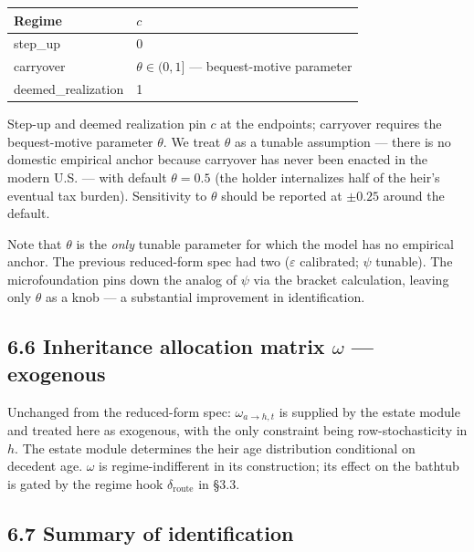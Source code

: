 \documentclass[11pt]{article}
\begin{document}
\begin{center}
\begin{tabular}{|l|l|}
\hline
Regime & $c$ \\
\hline
step\_up & 0 \\
\hline
carryover & $\theta \in (0, 1]$ — bequest-motive parameter \\
\hline
deemed\_realization & 1 \\
\hline
\end{tabular}
\end{center}

Step-up and deemed realization pin $c$ at the endpoints; carryover requires the bequest-motive parameter $\theta$. We treat $\theta$ as a tunable assumption — there is no domestic empirical anchor because carryover has never been enacted in the modern U.S. — with default $\theta = 0.5$ (the holder internalizes half of the heir's eventual tax burden). Sensitivity to $\theta$ should be reported at $\pm 0.25$ around the default.

Note that $\theta$ is the \emph{only} tunable parameter for which the model has no empirical anchor. The previous reduced-form spec had two ($\varepsilon$ calibrated; $\psi$ tunable). The microfoundation pins down the analog of $\psi$ via the bracket calculation, leaving only $\theta$ as a knob — a substantial improvement in identification.

\subsection*{6.6 Inheritance allocation matrix $\omega$ — exogenous}

Unchanged from the reduced-form spec: $\omega_{a \to h, t}$ is supplied by the estate module and treated here as exogenous, with the only constraint being row-stochasticity in $h$. The estate module determines the heir age distribution conditional on decedent age. $\omega$ is regime-indifferent in its construction; its effect on the bathtub is gated by the regime hook $\delta_{\text{route}}$ in §3.3.

\subsection*{6.7 Summary of identification}
\end{document}
